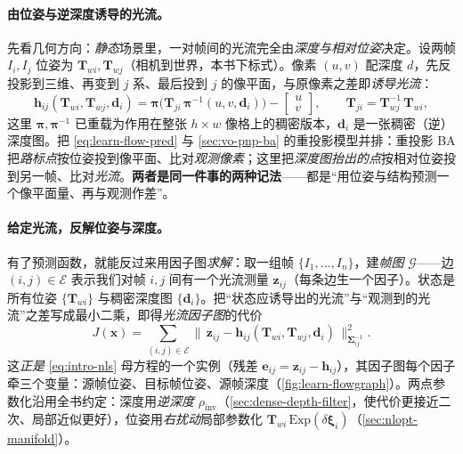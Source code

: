\paragraph{由位姿与逆深度诱导的光流。}
先看几何方向：\emph{静态}场景里，一对帧间的光流完全由\emph{深度与相对位姿}决定。设两帧 $I_i,I_j$ 位姿为 $\mathbf{T}_{wi},\mathbf{T}_{wj}$（相机到世界，本书下标式）。像素 $(u,v)$ 配深度 $d$，先反投影到三维、再变到 $j$ 系、最后投到 $j$ 的像平面，与原像素之差即\emph{诱导光流}：
\begin{equation}
  \mathbf{h}_{ij}(\mathbf{T}_{wi},\mathbf{T}_{wj},\mathbf{d}_i)
  =\boldsymbol\pi\!\Big(\mathbf{T}_{ji}\,\boldsymbol\pi^{-1}(u,v,\mathbf{d}_i)\Big)-\begin{bmatrix}u\\v\end{bmatrix},
  \qquad \mathbf{T}_{ji}=\mathbf{T}_{wj}^{-1}\,\mathbf{T}_{wi},
  \label{eq:learn-flow-pred}
\end{equation}
这里 $\boldsymbol\pi,\boldsymbol\pi^{-1}$ 已重载为作用在整张 $h\times w$ 像格上的稠密版本，$\mathbf{d}_i$ 是一张稠密（逆）深度图。把 \cref{eq:learn-flow-pred} 与 \cref{sec:vo-pnp-ba} 的重投影模型并排：重投影 BA 把\emph{路标点}按位姿投到像平面、比对\emph{观测像素}；这里把\emph{深度图抬出的点}按相对位姿投到另一帧、比对\emph{光流}。\textbf{两者是同一件事的两种记法}——都是“用位姿与结构预测一个像平面量、再与观测作差”。

\paragraph{给定光流，反解位姿与深度。}
有了预测函数，就能反过来用因子图\emph{求解}：取一组帧 $\{I_1,\dots,I_n\}$，建\emph{帧图} $\mathcal{G}$——边 $(i,j)\in\mathcal{E}$ 表示我们对帧 $i,j$ 间有一个光流测量 $\mathbf{z}_{ij}$（每条边生一个因子）。状态是所有位姿 $\{\mathbf{T}_{wi}\}$ 与稠密深度图 $\{\mathbf{d}_i\}$。把“状态应诱导出的光流”与“观测到的光流”之差写成最小二乘，即得\emph{光流因子图}的代价
\begin{equation}
  J(\mathbf{x})
  =\sum_{(i,j)\in\mathcal{E}}
  \big\|\,\mathbf{z}_{ij}-\mathbf{h}_{ij}(\mathbf{T}_{wi},\mathbf{T}_{wj},\mathbf{d}_i)\,\big\|_{\boldsymbol\Sigma_{ij}^{-1}}^2.
  \label{eq:learn-flow-cost}
\end{equation}
这\emph{正是} \cref{eq:intro-nls} 母方程的一个实例（残差 $\mathbf{e}_{ij}=\mathbf{z}_{ij}-\mathbf{h}_{ij}$），其因子图每个因子牵三个变量：源帧位姿、目标帧位姿、源帧深度（\cref{fig:learn-flowgraph}）。两点参数化沿用全书约定：深度用\emph{逆深度} $\rho_{\mathrm{inv}}$（\cref{sec:dense-depth-filter}，使代价更接近二次、局部近似更好），位姿用\emph{右扰动}局部参数化 $\mathbf{T}_{wi}\,\mathrm{Exp}(\delta\boldsymbol\xi_i)$（\cref{sec:nlopt-manifold}）。

